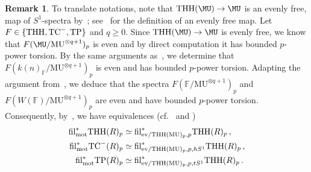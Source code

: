 \documentclass[english,10pt]{amsart}
\newcommand{\field}{\mathbb{F}}
\theoremstyle{definition}
\newtheorem{rema}{Remark}[section]
\numberwithin{equation}{section}
\DeclareMathOperator{\TC}{TC}
\DeclareMathOperator{\thh}{\ensuremath{\textup{THH}}}
\newcommand{\THH}{\thh}
\newcommand{\TP}{\mathrm{TP}}
\begin{document}
\begin{rema}
To translate notations, note that $\THH(\MU)\to \MU$ is an evenly free,  map of $S^1$-spectra by~\cite[Example~4.2.3]{hahn2022motivic}; see~\cite[Definition 2.2.15]{hahn2022motivic} for the definition of an evenly free map. Let $F\in \{\THH, \TC^{-},\TP\}$ and $q\ge 0$. Since $\THH(\MU)\to \MU$ is evenly free, we know that $F(\MU/\mathrm{MU}^{\otimes q+1})_p$ is even and by direct computation it has bounded $p$-power torsion. By the same arguments as~\cite[Proposition~2.2.18,~Theorem~4.5.2]{angelini2024syntomic}, we determine that 
$F(k(n)_{\field} /\mathrm{MU}^{\otimes q+1})_p$ is even and has bounded $p$-power torsion. Adapting the argument from~\cite[Theorem~E]{hahn2020redshift}, we deduce that the spectra $F(\field/\mathrm{MU}^{\otimes q+1})_p$ and $F(W(\field)/\mathrm{MU}^{\otimes q+1})_p$ are even and have bounded $p$-power torsion. 
Consequently, by~\cite[Corollary~A.2.6]{hahn2022motivic},
we have equivalences (cf.~\cite[Definition~4.2.1]{hahn2022motivic} and \cite[\S~2.1.1]{angelini2024syntomic})
\begin{align*}
\mathrm{fil}_{\textup{mot}}^*\mathrm{THH}(R)_p  &\simeq \mathrm{fil}_{\textup{ev}/\mathrm{THH}(\mathrm{MU})_p,p}^*\mathrm{THH}(R)_p  \,,  \\
\mathrm{fil}_{\textup{mot}}^*\mathrm{TC}^{-}(R)_p  &\simeq \mathrm{fil}_{\textup{ev}/\mathrm{THH}(\mathrm{MU})_p,p,hS^1}^*\mathrm{THH}(R)_p  \,, \\
\mathrm{fil}_{\textup{mot}}^*\mathrm{TP}(R)_p   &\simeq \mathrm{fil}_{\textup{ev}/\mathrm{THH}(\mathrm{MU})_p,p,tS^1}^*\mathrm{THH}(R)_p \,. 
\end{align*}
\end{rema}
\end{document}
